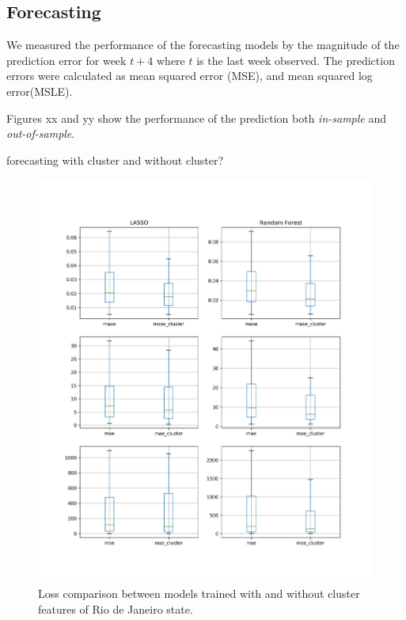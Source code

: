 \documentclass[12pt]{report}
\begin{document}
\subsection{Forecasting}
We measured the performance of the forecasting models by the magnitude of the prediction error for week $t+4$ where $t$ is the last week observed. The prediction errors were calculated as mean squared error (MSE), and mean squared log error(MSLE).

Figures xx and yy show the performance of the prediction  both \emph{in-sample} and  \emph{out-of-sample}.

forecasting with cluster and without cluster?

\begin{figure}
\centering
\includegraphics[width=\textwidth]{compar_fore_cluster_RJ.png}
\caption{Loss comparison between models trained with and without cluster features of Rio de Janeiro state.}
\label{fig:cluster_compar_rj}
\end{figure}
\end{document}
